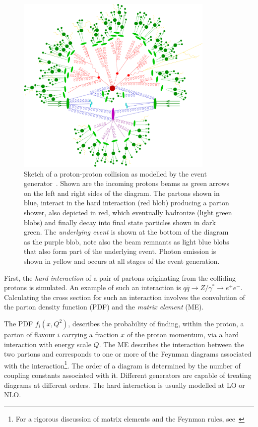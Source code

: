 \begin{figure}[htbp]
  \centering
  \includegraphics[width=0.85\textwidth]{PartDetector/Diagrams/scetch.eps}
  \caption{Sketch of a proton-proton collision as modelled by the event generator~\cite{Event}. Shown are the incoming protons beams as green arrows on the left and right sides of the diagram. The partons shown in blue, interact in the hard interaction (red blob) producing a parton shower, also depicted in red, which eventually hadronize (light green blobs) and finally decay into final state particles shown in dark green. The \emph{underlying event} is shown at the bottom of the diagram as the purple blob, note also the beam remnants as light blue blobs that also form part of the underlying event. Photon emission is shown in yellow and occurs at all stages of the event generation.}
  \label{fig:DetectorEGSketch}
\end{figure}

First, the \emph{hard interaction} of a pair of partons originating from the colliding protons is simulated. An example of such an interaction is $q\bar{q} \rightarrow Z / \gamma^{*}\rightarrow e^{+}e^{-}$. Calculating the cross section for such an interaction involves the convolution of the parton density function (PDF) and the \emph{matrix element} (ME).

The PDF $f_i(x,Q^2)$, describes the probability of finding, within the proton, a parton of flavour $i$ carrying a fraction $x$ of the proton momentum, via a hard interaction with energy scale $Q$. The ME describes the interaction between the two partons and corresponds to one or more of the Feynman diagrams associated with the interaction\footnote{For a rigorous discussion of matrix elements and the Feynman rules, see~\cite{Theory:Perkins,Theory:IntroGriffiths}}. The order of a diagram is determined by the number of coupling constants associated with it. Different generators are capable of treating diagrams at different orders. The hard interaction is usually modelled at LO or NLO.

